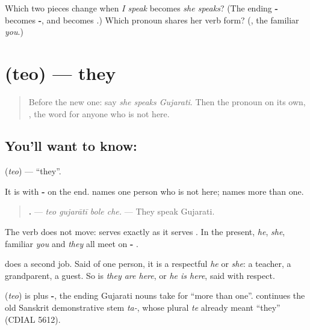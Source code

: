 \begin{tcolorbox}[breakable,colback=teal!4,colframe=teal!35!black,title={Before you move on}]
Which two pieces change when \emph{I speak} becomes \emph{she speaks}? (The ending \textbf{-} becomes \textbf{-}, and \textbf{} becomes \textbf{}.) Which pronoun shares her verb form? (\textbf{}, the familiar \emph{you}.)
\end{tcolorbox}
\section[\texorpdfstring{\gu{તેઓ} (teo)}{તેઓ (teo)}]{ (teo) — they}

\label{lesson:GU-C145-teo}



\begin{quote}
Before the new one: say \emph{she speaks Gujarati}. Then the pronoun on its own, \textbf{}, the word for anyone who is not here.
\end{quote}

\subsection*{You'll want to know: }
\textbf{} (\emph{teo}) — \textquotedblleft{}they\textquotedblright{}.

It is \textbf{} with \textbf{-} on the end. \textbf{} names one person who is not here; \textbf{} names more than one.

\begin{quote}
\textbf{   .} — \emph{teo gujarātī bole che.} — They speak Gujarati.
\end{quote}

The verb does not move: \textbf{ } serves \textbf{} exactly as it serves \textbf{}. In the present, \emph{he}, \emph{she}, familiar \emph{you} and \emph{they} all meet on \textbf{- }.

\textbf{} does a second job. Said of one person, it is a respectful \emph{he} or \emph{she}: a teacher, a grandparent, a guest. So \textbf{  } is \emph{they are here}, or \emph{he is here}, said with respect.

\begin{cousinweb}
\textbf{} (\emph{teo}) is \textbf{} plus \textbf{-}, the ending Gujarati nouns take for \textquotedblleft{}more than one\textquotedblright{}. \textbf{} continues the old Sanskrit demonstrative stem \emph{ta-}, whose plural \emph{te} already meant \textquotedblleft{}they\textquotedblright{} (CDIAL 5612).
\end{cousinweb}

